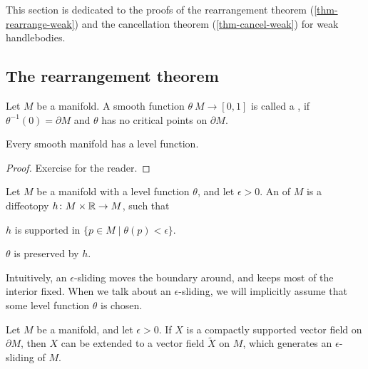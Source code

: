 \label{sec-proofs}

This section is dedicated to the proofs of the
rearrangement theorem (\ref{thm-rearrange-weak}) and
the cancellation theorem (\ref{thm-cancel-weak})
for weak handlebodies.

\subsection{The rearrangement theorem}

\begin{definition}
    Let $M$ be a manifold.
    A smooth function $\theta\:M\to[0,1]$ is called a ,
    if $\theta^{-1}(0)=\partial M$ and $\theta$ has no critical points on $\partial M$.
\end{definition}

\begin{proposition}
    Every smooth manifold has a level function.
\end{proposition}

\begin{proof}
    Exercise for the reader.
\end{proof}

\begin{definition}
    Let $M$ be a manifold with a level function $\theta$, and let $\epsilon>0$.
    An  of $M$ is a diffeotopy $h\colon M\times\mathbb{R}\to M$, such that
    \begin{enum}
        \item $h$ is supported in $\{p\in M\mid \theta(p)<\epsilon\}$.
        \item $\theta$ is preserved by $h$.
    \end{enum}
\end{definition}

Intuitively, an $\epsilon$-sliding moves the boundary around,
and keeps most of the interior fixed.
When we talk about an $\epsilon$-sliding,
we will implicitly assume that some level function $\theta$ is chosen.

\begin{lemma}\label{lem:slide}
Let $M$ be a manifold, and let $\epsilon>0$.
If $X$ is a compactly supported vector field on $\partial M$,
then $X$ can be extended to a vector field $\widetilde X$ on $M$,
which generates an $\epsilon$-sliding of $M$.
\end{lemma}

